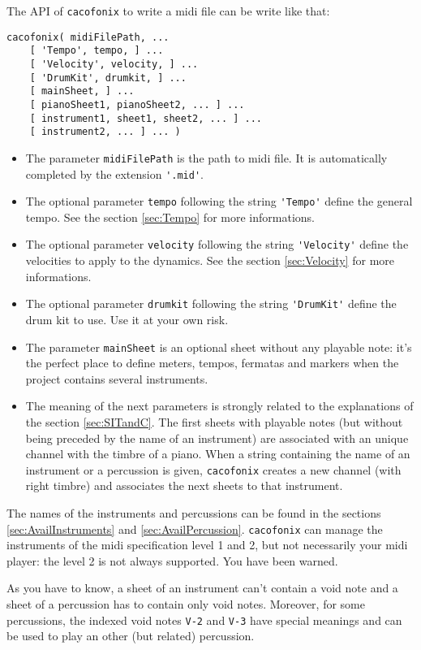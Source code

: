 \documentclass{article}
\begin{document}
The API of \lstinline!cacofonix! to write a midi file can be write like that:
\begin{lstlisting}
cacofonix( midiFilePath, ...
	[ 'Tempo', tempo, ] ...
	[ 'Velocity', velocity, ] ...
	[ 'DrumKit', drumkit, ] ...
	[ mainSheet, ] ...
	[ pianoSheet1, pianoSheet2, ... ] ...
	[ instrument1, sheet1, sheet2, ... ] ...
	[ instrument2, ... ] ... )
\end{lstlisting}
\begin{itemize}
	\item The parameter \lstinline!midiFilePath! is the path to midi file. It is automatically completed by the extension \lstinline!'.mid'!.
	\item The optional parameter \lstinline!tempo! following the string \lstinline!'Tempo'! define the general tempo. See the section \ref{sec:Tempo} for more informations.
	\item The optional parameter \lstinline!velocity! following the string \lstinline!'Velocity'! define the velocities to apply to the dynamics. See the section \ref{sec:Velocity} for more informations.
	\item The optional parameter \lstinline!drumkit! following the string \lstinline!'DrumKit'! define the drum kit to use. Use it at your own risk.
	\item The parameter \lstinline!mainSheet! is an optional sheet without any playable note: it's the perfect place to define meters, tempos, fermatas and markers when the project contains several instruments.
	\item The meaning of the next parameters is strongly related to the explanations of the section \ref{sec:SITandC}. The first sheets with playable notes (but without being preceded by the name of an instrument) are associated with an unique channel with the timbre of a piano. When a string containing the name of an instrument or a percussion is given, \lstinline!cacofonix! creates a new channel (with right timbre) and associates the next sheets to that instrument.
\end{itemize}

The names of the instruments and percussions can be found in the sections \ref{sec:AvailInstruments} and \ref{sec:AvailPercussion}. \lstinline!cacofonix! can manage the instruments of the midi specification level 1 and 2, but not necessarily your midi player: the level 2 is not always supported. You have been warned.

As you have to know, a sheet of an instrument can't contain a void note and a sheet of a percussion has to contain only void notes. Moreover, for some percussions, the indexed void notes \lstinline!V-2! and \lstinline!V-3! have special meanings and can be used to play an other (but related) percussion.
\end{document}
